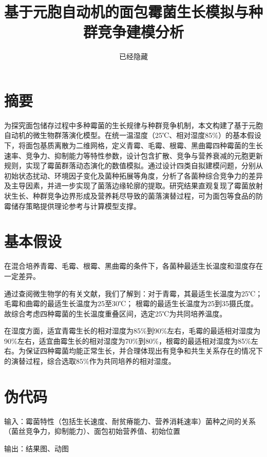 \documentclass[12pt]{ctexart}
\begin{document}
\title{基于元胞自动机的面包霉菌生长模拟与种群竞争建模分析}
\author{已经隐藏}
\date{}
\maketitle
\section*{摘要}
为探究面包储存过程中多种霉菌的生长规律与种群竞争机制，本文构建了基于元胞自动机的微生物群落演化模型。在统一温湿度（25℃、相对湿度85\%）的基本假设下，将面包基质离散为二维网格，定义青霉、毛霉、根霉、黑曲霉四种霉菌的生长速率、竞争力、抑制能力等特性参数，设计包含扩散、竞争与营养衰减的元胞更新规则，实现了霉菌群落动态演化的数值模拟。通过设计四类自拟建模问题，分别从初始状态扰动、环境因子变化及菌种拓展等角度，分析了各菌种综合竞争力的差异及主导因素，并进一步实现了菌落边缘轮廓的提取。研究结果直观复现了霉菌放射状生长、种群竞争边界形成及营养耗尽导致的菌落演替过程，可为面包等食品的防霉储存策略提供理论参考与计算模型支撑。
\newpage

\tableofcontents
\newpage

\section{基本假设}
在混合培养青霉、毛霉、根霉、黑曲霉的条件下，各菌种最适生长温度和湿度存在一定差异。

通过查阅微生物学的有关文献，我们了解到：对于青霉，其最适生长温度为25℃；毛霉和曲霉的最适生长温度为25至30℃； 根霉的最适生长温度为25到35摄氏度。故综合考虑四种霉菌的生长温度重叠区间，选定25℃为共同培养温度。

在湿度方面，适宜青霉生长的相对湿度为85\%到90\%左右，毛霉的最适相对湿度为90\%左右，适宜曲霉生长的相对湿度为70\%到80\%，根霉的最适相对湿度为85\%左右。为保证四种霉菌均能正常生长，并合理体现出有竞争和共生关系存在的情况下的演替过程，综合选取85\%作为共同培养的相对湿度。

\section{伪代码}
输入：霉菌特性（包括生长速度、耐贫瘠能力、营养消耗速率）菌种之间的关系（菌丝竞争力，抑制能力）、面包初始营养值、初始位置

输出：结果图、动图
\end{document}
